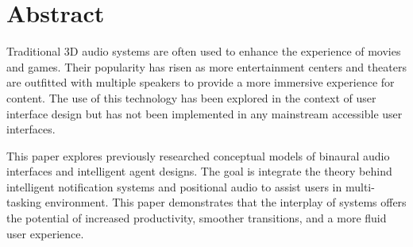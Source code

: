 \newpage
\chapter{Abstract}

Traditional 3D audio systems are often used to enhance the experience of movies
and games. Their popularity has risen as more entertainment centers and theaters
are outfitted with multiple speakers to provide a more immersive experience for
content. The use of this technology has been explored in the context of user
interface design but has not been implemented in any mainstream accessible user
interfaces.

This paper explores previously researched conceptual models of binaural audio
interfaces and intelligent agent designs. The goal is integrate the theory
behind intelligent notification systems and positional audio  to assist users
in multi-tasking environment. This paper demonstrates that the interplay of
systems offers the potential of increased productivity, smoother transitions, and
a more fluid user experience.
